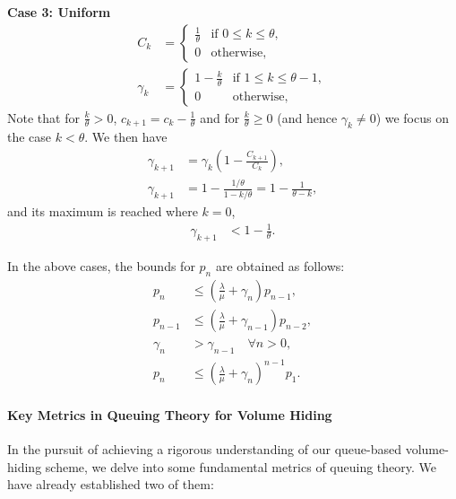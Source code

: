 \documentclass{article}
\begin{document}
\textbf{Case 3: Uniform}
\begin{align*}
C_k &= 
\begin{cases} 
  \frac{1}{\theta} & \text{if } 0 \leq k \leq \theta, \\
  0 & \text{otherwise},
\end{cases} \\
\gamma_k &= 
\begin{cases} 
  1 - \frac{k}{\theta} & \text{if } 1 \leq k \leq \theta - 1, \\
  0 & \text{otherwise},
\end{cases}
\end{align*}
Note that for $\frac{k}{\theta} > 0$, $c_{k+1} = c_k - \frac{1}{\theta}$ and for $\frac{k}{\theta} \geq 0$ (and hence $\gamma_k \neq 0$) we focus on the case $k < \theta$. We then have
\begin{align*}
\gamma_{k+1} &= \gamma_k \left( 1 - \frac{C_{k+1}}{C_k} \right), \\
\gamma_{k+1} &= 1 - \frac{1/\theta}{1 - k/\theta} = 1 - \frac{1}{\theta - k},
\end{align*}
and its maximum is reached where $k = 0$,
\begin{align*}
\gamma_{k+1} &< 1 - \frac{1}{\theta}.
\end{align*}

In the above cases, the bounds for $p_n$ are obtained as follows:
\begin{align*}
p_n &\leq \left( \frac{\lambda}{\mu} + \gamma_n \right) p_{n-1}, \\
p_{n-1} &\leq \left( \frac{\lambda}{\mu} + \gamma_{n-1} \right) p_{n-2}, \\
\gamma_n &> \gamma_{n-1} \quad \forall n > 0, \\
p_n &\leq \left( \frac{\lambda}{\mu} + \gamma_n \right)^{n-1} p_1.
\end{align*}



\paragraph{Key Metrics in Queuing Theory for Volume Hiding}
In the pursuit of achieving a rigorous understanding of our queue-based volume-hiding scheme, we delve into some fundamental metrics of queuing theory. We have already established two of them: 
\end{document}
